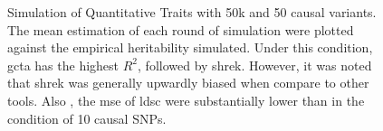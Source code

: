 \begin{figure}
{				\label{fig:50k50cQtmeanI}
			}
			\caption[Simulation of Quantitative Traits with 50k  and 50 causal variants]
			{Simulation of Quantitative Traits with 50k  and 50 causal variants.
				The mean estimation of each round of simulation were plotted against the empirical heritability simulated.
				Under this condition, \gls{gcta} has the highest $R^2$, followed by \gls{shrek}. 
				However, it was noted that \gls{shrek} was generally upwardly biased when compare to other tools.
				Also , the \gls{mse} of \gls{ldsc} were substantially lower than in the condition of 10 causal \glspl{SNP}.
				} 
			\label{fig:50k50cQtMean}
		\end{figure}
		\begin{figure}
			\centering
			\centering
			\subfloat[GCTA]{
}
\end{figure}
